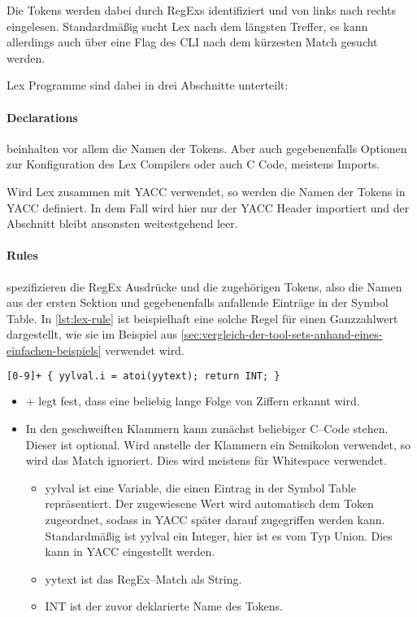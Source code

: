Die Tokens werden dabei durch \acp{RegEx} identifiziert und von links nach rechts eingelesen.
Standardmäßig sucht Lex nach dem längsten Treffer, es kann allerdings auch über eine Flag des \ac{CLI} nach dem kürzesten Match gesucht werden.

Lex Programme sind dabei in drei Abschnitte unterteilt:


\paragraph{Declarations} beinhalten vor allem die Namen der Tokens.
Aber auch gegebenenfalls Optionen zur Konfiguration des Lex Compilers oder auch C Code, meistens Imports.

Wird Lex zusammen mit \ac{YACC} verwendet, so werden die Namen der Tokens in \ac{YACC} definiert.
In dem Fall wird hier nur der \ac{YACC} Header importiert und der Abschnitt bleibt ansonsten weitestgehend leer.

\paragraph{Rules} spezifizieren die \ac{RegEx} Ausdrücke und die zugehörigen Tokens, also die Namen aus der ersten Sektion und gegebenenfalls anfallende Einträge in der Symbol Table.
In \autoref{lst:lex-rule} ist beispielhaft eine solche Regel für einen Ganzzahlwert dargestellt, wie sie im Beispiel aus \autoref{sec:vergleich-der-tool-sets-anhand-eines-einfachen-beispiels} verwendet wird.
\begin{lstlisting}[label={lst:lex-rule},caption={Lex Regel},language=lex]
[0-9]+ { yylval.i = atoi(yytext); return INT; }
\end{lstlisting}
\begin{itemize}
    \item {\ttfamily [0-9]+} legt fest, dass eine beliebig lange Folge von Ziffern erkannt wird.
    \item In den geschweiften Klammern kann zunächst beliebiger C--Code stehen.
    Dieser ist optional.
    Wird anstelle der Klammern ein Semikolon verwendet, so wird das Match ignoriert.
    Dies wird meistens für Whitespace verwendet.
    \begin{itemize}
        \item {\ttfamily yylval} ist eine Variable, die einen Eintrag in der Symbol Table repräsentiert.
        Der zugewiesene Wert wird automatisch dem Token zugeordnet, sodass in \ac{YACC} später darauf zugegriffen werden kann.
        Standardmäßig ist {\ttfamily yylval} ein Integer, hier ist es vom Typ Union.
        Dies kann in \ac{YACC} eingestellt werden.
        \item {\ttfamily yytext} ist das \acs{RegEx}--Match als String.
        \item {\ttfamily INT} ist der zuvor deklarierte Name des Tokens.
    \end{itemize}
\end{itemize}

